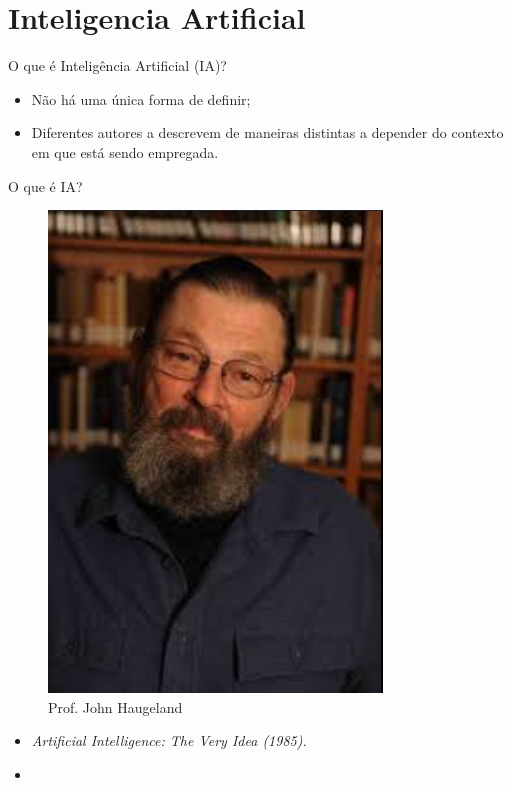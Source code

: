 \section{Inteligencia Artificial}


\begin{frame}{O que é Inteligência Artificial (IA)?}
    \begin{block}{}
        \begin{itemize}
            \item Não há uma única forma de definir; 
            \pause
            \item Diferentes autores a descrevem de maneiras distintas a depender do contexto em que está sendo empregada.
        \end{itemize}
    \end{block}
\end{frame}
\begin{frame}{O que é IA?}
    \begin{minipage}{0.5\linewidth}
        \begin{figure}
            \centering
            \includegraphics[width=0.6\linewidth]{imagens//secao1/haugeland1985.png}
            \caption{Prof. John Haugeland}
        \end{figure}
    \end{minipage}
    \begin{minipage}{0.5\linewidth}
        \begin{itemize}
        \justifying
            \item \textit{Artificial Intelligence: The Very Idea (1985).}
            \item {}
        \end{itemize}
    \end{minipage}
\end{frame}

